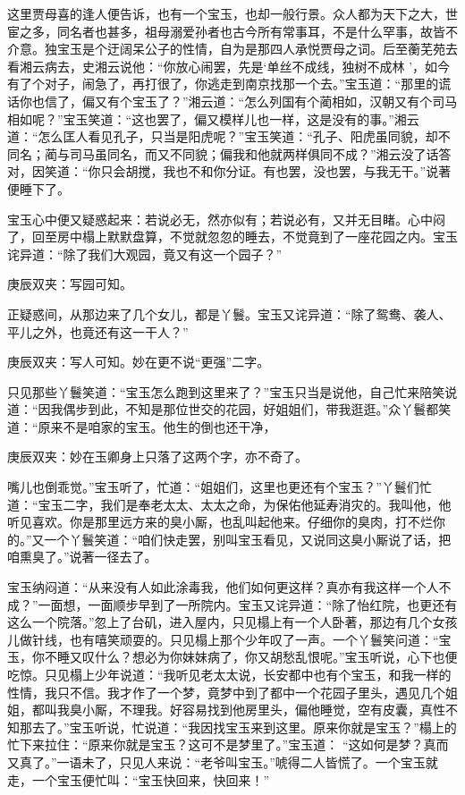 \begin{parag}
    这里贾母喜的逢人便告诉，也有一个宝玉，也却一般行景。众人都为天下之大，世宦之多，同名者也甚多，祖母溺爱孙者也古今所有常事耳，不是什么罕事，故皆不介意。独宝玉是个迂阔呆公子的性情，自为是那四人承悦贾母之词。后至蘅芜苑去看湘云病去，史湘云说他：“你放心闹罢，先是‘单丝不成线，独树不成林 ’，如今有了个对子，闹急了，再打很了，你逃走到南京找那一个去。”宝玉道：“那里的谎话你也信了，偏又有个宝玉了？”湘云道：“怎么列国有个蔺相如，汉朝又有个司马相如呢？”宝玉笑道：“这也罢了，偏又模样儿也一样，这是没有的事。”湘云道：“怎么匡人看见孔子，只当是阳虎呢？”宝玉笑道：“孔子、阳虎虽同貌，却不同名；蔺与司马虽同名，而又不同貌；偏我和他就两样俱同不成？”湘云没了话答对，因笑道：“你只会胡搅，我也不和你分证。有也罢，没也罢，与我无干。”说著便睡下了。
\end{parag}


\begin{parag}
    宝玉心中便又疑惑起来：若说必无，然亦似有；若说必有，又并无目睹。心中闷了，回至房中榻上默默盘算，不觉就忽忽的睡去，不觉竟到了一座花园之内。宝玉诧异道：“除了我们大观园，竟又有这一个园子？”\begin{note}庚辰双夹：写园可知。\end{note}正疑惑间，从那边来了几个女儿，都是丫鬟。宝玉又诧异道：“除了鸳鸯、袭人、平儿之外，也竟还有这一干人？”\begin{note}庚辰双夹：写人可知。妙在更不说“更强”二字。\end{note}只见那些丫鬟笑道：“宝玉怎么跑到这里来了？”宝玉只当是说他，自己忙来陪笑说道：“因我偶步到此，不知是那位世交的花园，好姐姐们，带我逛逛。”众丫鬟都笑道：“原来不是咱家的宝玉。他生的倒也还干净，\begin{note}庚辰双夹：妙在玉卿身上只落了这两个字，亦不奇了。\end{note}嘴儿也倒乖觉。”宝玉听了，忙道：“姐姐们，这里也更还有个宝玉？”丫鬟们忙道：“宝玉二字，我们是奉老太太、太太之命，为保佑他延寿消灾的。我叫他，他听见喜欢。你是那里远方来的臭小厮，也乱叫起他来。仔细你的臭肉，打不烂你的。”又一个丫鬟笑道：“咱们快走罢，别叫宝玉看见，又说同这臭小厮说了话，把咱熏臭了。”说著一径去了。
\end{parag}


\begin{parag}
    宝玉纳闷道：“从来没有人如此涂毒我，他们如何更这样？真亦有我这样一个人不成？”一面想，一面顺步早到了一所院内。宝玉又诧异道：“除了怡红院，也更还有这么一个院落。”忽上了台矶，进入屋内，只见榻上有一个人卧著，那边有几个女孩儿做针线，也有嘻笑顽耍的。只见榻上那个少年叹了一声。一个丫鬟笑问道：“宝玉，你不睡又叹什么？想必为你妹妹病了，你又胡愁乱恨呢。”宝玉听说，心下也便吃惊。只见榻上少年说道：“我听见老太太说，长安都中也有个宝玉，和我一样的性情，我只不信。我才作了一个梦，竟梦中到了都中一个花园子里头，遇见几个姐姐，都叫我臭小厮，不理我。好容易找到他房里头，偏他睡觉，空有皮囊，真性不知那去了。”宝玉听说，忙说道：“我因找宝玉来到这里。原来你就是宝玉？”榻上的忙下来拉住：“原来你就是宝玉？这可不是梦里了。”宝玉道： “这如何是梦？真而又真了。”一语未了，只见人来说：“老爷叫宝玉。”唬得二人皆慌了。一个宝玉就走，一个宝玉便忙叫：“宝玉快回来，快回来！”
\end{parag}


